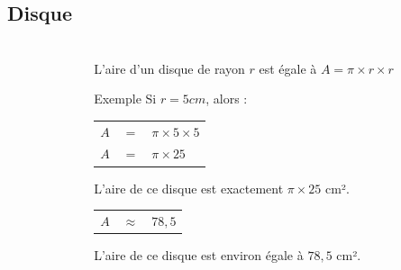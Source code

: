 \documentclass[xcolor=table]{beamer}
\begin{document}
\subsection{Disque}	

\begin{frame}
	\frametitle{}  
	\framesubtitle{}	
	
	\begin{columns}[onlytextwidth]
		\begin{column}{0.35\textwidth}
			
		\end{column}
		\begin{column}{0.65\textwidth}
			L'aire d'un disque de rayon $r$ est égale à \textbf{$A=\pi \times r \times r$}
			
			\begin{block}{Exemple}
				Si $r = 5 cm$, alors : \\
				\begin{tabular}{ccl}
					
					$A $ & $=$ & $\pi \times 5 \times 5$ \\
					$A $ & $=$ & $\pi \times 25$ \\
				\end{tabular}
				
				L'aire de ce disque est exactement $\pi \times 25$ cm².
				
				
				\begin{tabular}{ccl}
					
					$A $ & $\approx$ & $78,5$ \\

				\end{tabular}
				
				L'aire de ce disque est environ égale à $78,5$ cm².
			\end{block}
		\end{column}
	\end{columns}
	
	
\end{frame}
\end{document}
